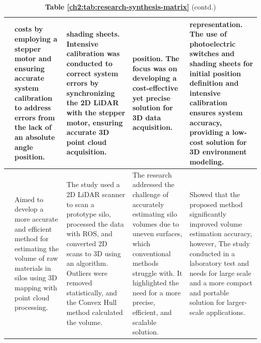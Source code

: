 \begin{landscape}
	\begin{table}[ht]
		\begin{threeparttable}
			\caption*{\textbf{Table \ref{ch2:tab:research-synthesis-matrix}} (contd.)}
			\label{ch2:tab:research-synthesis-matrix-contd.}
			\begin{tabular}{p{2cm}  p{4.3cm} p{4.3cm} p{4.3cm} p{4.3cm}}
				\midrule
				{}                                                                                                                                                                                                                               &
				costs by employing a stepper motor and ensuring accurate system calibration to address errors from the lack of an absolute angle position.                                                                                       &
				shading sheets. Intensive calibration was conducted to correct system errors by synchronizing the 2D LiDAR with the stepper motor, ensuring accurate 3D point cloud acquisition.                                                 &
				position. The focus was on developing a cost-effective yet precise solution for 3D data acquisition.                                                                                                                             &
				representation. The use of photoelectric switches and shading sheets for initial position definition and intensive calibration ensures system accuracy, providing a low-cost solution for 3D environment modeling.                     \\
				\midrule
				\citet{clar2022}                                                                                                                                                                                                                 &
				Aimed to develop a more accurate and efficient method for estimating the volume of raw materials in silos using 3D mapping with point cloud processing.                                                                          &
				The study used a 2D LiDAR scanner to scan a prototype silo, processed the data with ROS, and converted 2D scans to 3D using an algorithm. Outliers were removed statistically, and the Convex Hull method calculated the volume. &
				The research addressed the challenge of accurately estimating silo volumes due to uneven surfaces, which conventional methods struggle with. It highlighted the need for a more precise, efficient, and scalable solution.       &
				Showed that the proposed method significantly improved volume estimation accuracy, however, The study conducted in a laboratory test and needs for large scale and a more compact and portable solution for larger-scale applications. \\
				\midrule
			\end{tabular}
		\end{threeparttable}
	\end{table}
\end{landscape}

